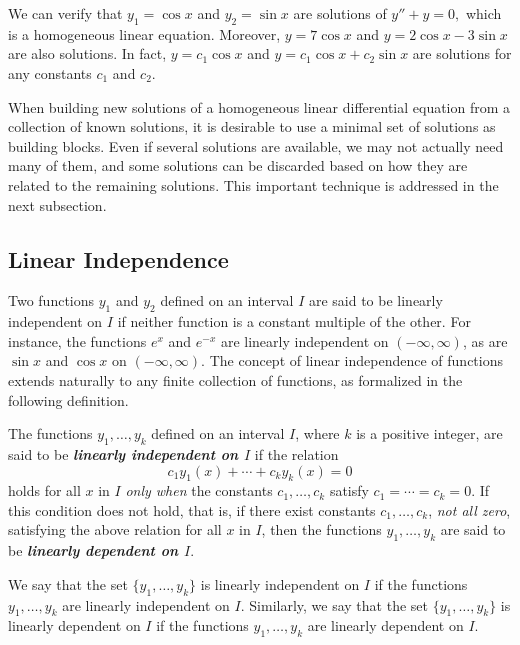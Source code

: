 \begin{example}
	We can verify that $y_1 = \cos x$ and $y_2 = \sin x$ are solutions of $y''+y = 0,$ which is a  homogeneous linear equation. Moreover, $y= 7 \cos x$  and $y = 2\cos x -3 \sin x$ are also solutions. In fact, $y = c_1 \cos x$ and $ y = c_1 \cos x+c_2 \sin x$  are solutions for any constants $c_1$ and $c_2.$
\end{example}

When building new solutions of a  homogeneous linear differential equation from a collection of known solutions, it is desirable to use a minimal set of solutions as building blocks. Even if several solutions are  available, we may not actually need many of them, and some solutions can be discarded based on how they are related to the remaining solutions. This important technique is addressed in the next subsection.

\subsection{Linear Independence}

Two functions \( y_1 \) and \( y_2 \) defined on an interval \( I \) are said to be linearly independent on \( I \) if neither function is a constant multiple of the other. For instance, the functions \( e^x \) and \( e^{-x} \) are linearly independent on \( (-\infty, \infty) \), as are \( \sin x \) and \( \cos x \) on \( (-\infty, \infty) \). The concept of linear independence of functions extends naturally to any finite collection of functions, as formalized in the following definition.


\begin{definition}\label{defn:linear-indepednence}
	
	The functions \( y_1, \dots, y_k \) defined on an interval \( I \), where \( k \) is a positive integer, are said to be \textbf{\textit{linearly independent on \( I \)}} if the relation
	\[
	c_1 y_1(x) + \cdots + c_k y_k(x) = 0
	\]
	holds for all $x$ in $I$ \textit{only when} the constants $c_1, \dots, c_k$ satisfy \( c_1 = \cdots = c_k = 0 \).
	If this condition does not hold, that is, if there exist constants \( c_1, \dots, c_k \), \textit{not all zero}, satisfying the above relation for all $x$ in 
	\( I \), then the functions 
	\( y_1, \dots, y_k\) are said to be \textbf{\textit{linearly dependent on \( I \)}}.
\end{definition}

We say that the set \(\{y_1, \dots, y_k\}\) is linearly independent on $I$ if the functions $y_1, \dots, y_k$  are linearly independent on $I.$ Similarly,  we say that the set \(\{y_1, \dots, y_k\}\) is linearly dependent on $I$ if the functions $y_1, \dots, y_k$  are linearly dependent on $I.$


